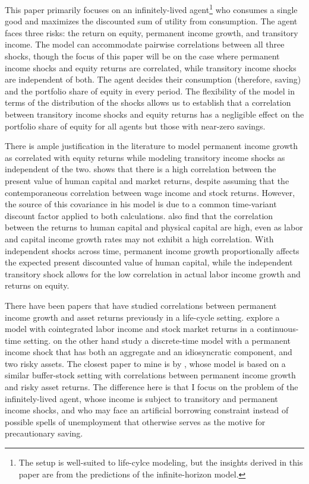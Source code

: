 This paper primarily focuses on an infinitely-lived agent\footnote{The setup is well-suited to life-cylce modeling, but the insights derived in this paper are from the predictions of the infinite-horizon model.} who consumes a single good and maximizes the discounted sum of utility from consumption. The agent faces three risks: the return on equity, permanent income growth, and transitory income. The model can accommodate pairwise correlations between all three shocks, though the focus of this paper will be on the case where permanent income shocks and equity returns are correlated, while transitory income shocks are independent of both. The agent decides their consumption (therefore, saving) and the portfolio share of equity in every period. The flexibility of the model in terms of the distribution of the shocks allows us to establish that a correlation between transitory income shocks and equity returns has a negligible effect on the portfolio share of equity for all agents but those with near-zero savings.

There is ample justification in the literature to model permanent income growth as correlated with equity returns while modeling transitory income shocks as independent of the two. \citet{Campbell1996} shows that there is a high correlation between the present value of human capital and market returns, despite assuming that the contemporaneous correlation between wage income and stock returns. However, the source of this covariance in his model is due to a common time-variant discount factor applied to both calculations. \citet{Baxter1997} also find that the correlation between the returns to human capital and physical capital are high, even as labor and capital income growth rates may not exhibit a high correlation. With independent shocks across time, permanent income growth proportionally affects the expected present discounted value of human capital, while the independent transitory shock allows for the low correlation in actual labor income growth and returns on equity.

There have been papers that have studied correlations between permanent income growth and asset returns previously in a life-cycle setting. \citet{Benzoni2007} explore a model with cointegrated labor income and stock market returns in a continuous-time setting. \citet{Bagliano2014} on the other hand study a discrete-time model with a permanent income shock that has both an aggregate and an idiosyncratic component, and two risky assets. The closest paper to mine is by \citet{Viceira2001}, whose model is based on a similar buffer-stock setting with correlations between permanent income growth and risky asset returns. The difference here is that I focus on the problem of the infinitely-lived agent, whose income is subject to transitory and permanent income shocks, and who may face an artificial borrowing constraint instead of possible spells of unemployment that otherwise serves as the motive for precautionary saving.


